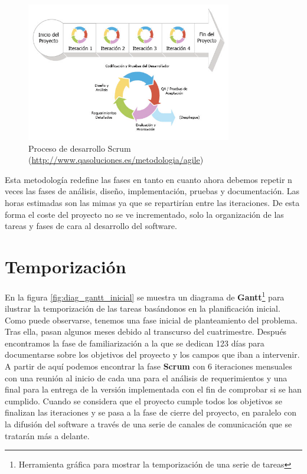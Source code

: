 \begin{figure}[!ht]
  \begin{center}
  \includegraphics[width=0.8\textwidth]{../images/scrum-iteration-detail-es.png}
  \caption{Proceso de desarrollo Scrum (\url{http://www.qasoluciones.es/metodologia/agile})}
  \label{fig:diag_scrum}
  \end{center}
\end{figure}

Esta metodología redefine las fases en tanto en cuanto ahora debemos repetir n veces las fases de análisis, diseño, implementación, pruebas y documentación. Las horas estimadas son las mimas ya que se repartirían entre las iteraciones. De esta forma el coste del proyecto no se ve incrementado, solo la organización de las tareas y fases de cara al desarrollo del software. 

\section{Temporización}

En la figura \ref{fig:diag_gantt_inicial} se muestra un diagrama de \textbf{Gantt}\footnote{Herramienta gráfica para mostrar la temporización de una serie de tareas} para ilustrar la temporización de las tareas basándonos en la planificación inicial. Como puede observarse, tenemos una fase inicial de planteamiento del problema. Tras ella, pasan algunos meses debido al transcurso del cuatrimestre. Después encontramos la fase de familiarización a la que se dedican 123 días para documentarse sobre los objetivos del proyecto y los campos que iban a intervenir. A partir de aquí podemos encontrar la fase \textbf{Scrum} con 6 iteraciones mensuales con una reunión al inicio de cada una para el análisis de requerimientos y una final para la entrega de la versión implementada con el fin de comprobar si se han cumplido. Cuando se considera que el proyecto cumple todos los objetivos se finalizan las iteraciones y se pasa a la fase de cierre del proyecto, en paralelo con la difusión del software a través de una serie de canales de comunicación que se tratarán más a delante.

